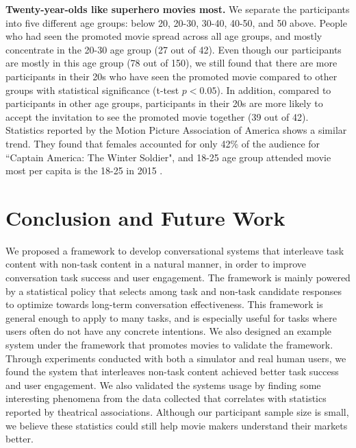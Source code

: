 \documentclass[11pt]{article}
\newcommand{\dk}[1]{{\color{red} #1}}
\begin{document}
\noindent\textbf{Twenty-year-olds like superhero movies most.}
We separate the participants into five different age groups: below 20, 20-30, 30-40, 40-50, and 50 above. 
People who had seen the promoted movie spread across all age groups, and mostly concentrate in the 20-30 age group (27 out of 42). Even though our participants are mostly in this age group (78 out of 150), we still found that there are more participants in their 20s who have seen the promoted movie compared to other groups with statistical significance (t-test $p<0.05$). In addition, compared to participants in other age groups, participants in their 20s are more likely to accept the invitation to see the promoted movie together (39 out of 42).
\\


Statistics reported by the Motion Picture Association of America shows a similar trend. They found that females accounted for only 42\% of the audience for ``Captain America: The Winter Soldier", and 18-25 age group attended movie most per capita is the 18-25 in 2015 \cite{theatrical}. 




\section{Conclusion and Future Work}
We proposed a framework to develop conversational systems that interleave task content with non-task content in a natural manner, in order to improve conversation task success and user engagement. The framework is mainly powered by a statistical policy that selects among task and non-task candidate responses to optimize towards long-term conversation effectiveness. This framework is general enough to apply to many tasks, and is especially useful for tasks where users often do not have any concrete intentions. We also designed an example system under the framework that promotes movies to validate the framework. Through experiments conducted with both a simulator and real human users, we found the system that interleaves non-task content achieved better task success and user engagement. We also validated the systems usage by finding some interesting phenomena from the data collected that correlates with statistics reported by theatrical associations. Although our participant sample size is small, we believe these statistics could still help movie makers understand their markets better.
\end{document}
